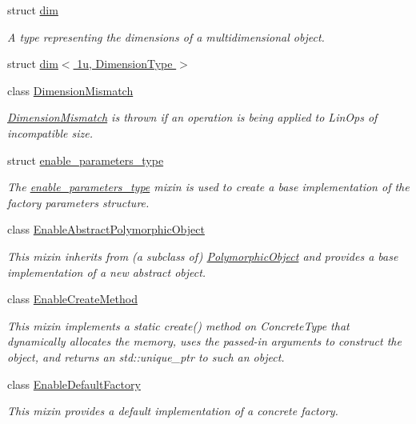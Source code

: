 \begin{DoxyCompactItemize}
struct \hyperlink{structgko_1_1dim}{dim}
\begin{DoxyCompactList}\small\item\em A type representing the dimensions of a multidimensional object. \end{DoxyCompactList}\item 
struct \hyperlink{structgko_1_1dim_3_011u_00_01DimensionType_01_4}{dim$<$ 1u, Dimension\+Type $>$}
\item 
class \hyperlink{classgko_1_1DimensionMismatch}{Dimension\+Mismatch}
\begin{DoxyCompactList}\small\item\em \hyperlink{classgko_1_1DimensionMismatch}{Dimension\+Mismatch} is thrown if an operation is being applied to Lin\+Ops of incompatible size. \end{DoxyCompactList}\item 
struct \hyperlink{structgko_1_1enable__parameters__type}{enable\+\_\+parameters\+\_\+type}
\begin{DoxyCompactList}\small\item\em The \hyperlink{structgko_1_1enable__parameters__type}{enable\+\_\+parameters\+\_\+type} mixin is used to create a base implementation of the factory parameters structure. \end{DoxyCompactList}\item 
class \hyperlink{classgko_1_1EnableAbstractPolymorphicObject}{Enable\+Abstract\+Polymorphic\+Object}
\begin{DoxyCompactList}\small\item\em This mixin inherits from (a subclass of) \hyperlink{classgko_1_1PolymorphicObject}{Polymorphic\+Object} and provides a base implementation of a new abstract object. \end{DoxyCompactList}\item 
class \hyperlink{classgko_1_1EnableCreateMethod}{Enable\+Create\+Method}
\begin{DoxyCompactList}\small\item\em This mixin implements a static {\ttfamily create()} method on {\ttfamily Concrete\+Type} that dynamically allocates the memory, uses the passed-\/in arguments to construct the object, and returns an std\+::unique\+\_\+ptr to such an object. \end{DoxyCompactList}\item 
class \hyperlink{classgko_1_1EnableDefaultFactory}{Enable\+Default\+Factory}
\begin{DoxyCompactList}\small\item\em This mixin provides a default implementation of a concrete factory. \end{DoxyCompactList}\item 

\end{DoxyCompactItemize}
